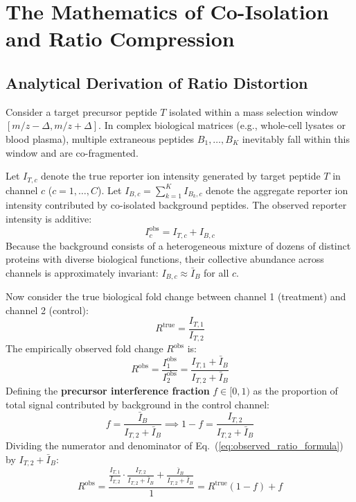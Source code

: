 \documentclass[11pt,oneside]{book}
\begin{document}
\section{The Mathematics of Co-Isolation and Ratio Compression}

\subsection{Analytical Derivation of Ratio Distortion}
Consider a target precursor peptide $T$ isolated within a mass selection window $[m/z - \Delta, m/z + \Delta]$. In complex biological matrices (e.g., whole-cell lysates or blood plasma), multiple extraneous peptides $B_1, \dots, B_K$ inevitably fall within this window and are co-fragmented.

Let $I_{T,c}$ denote the true reporter ion intensity generated by target peptide $T$ in channel $c$ ($c = 1, \dots, C$). Let $I_{B,c} = \sum_{k=1}^K I_{B_k,c}$ denote the aggregate reporter ion intensity contributed by co-isolated background peptides. The observed reporter intensity is additive:
\begin{equation}
I_c^{\text{obs}} = I_{T,c} + I_{B,c}
\label{eq:observed_intensity}
\end{equation}
Because the background consists of a heterogeneous mixture of dozens of distinct proteins with diverse biological functions, their collective abundance across channels is approximately invariant: $I_{B,c} \approx \bar{I}_B$ for all $c$.

Now consider the true biological fold change between channel 1 (treatment) and channel 2 (control):
\begin{equation}
R^{\text{true}} = \frac{I_{T,1}}{I_{T,2}}
\end{equation}
The empirically observed fold change $R^{\text{obs}}$ is:
\begin{equation}
R^{\text{obs}} = \frac{I_{1}^{\text{obs}}}{I_{2}^{\text{obs}}} = \frac{I_{T,1} + \bar{I}_B}{I_{T,2} + \bar{I}_B}
\label{eq:observed_ratio_formula}
\end{equation}
Defining the \textbf{precursor interference fraction} $f \in [0, 1)$ as the proportion of total signal contributed by background in the control channel:
\begin{equation}
f = \frac{\bar{I}_B}{I_{T,2} + \bar{I}_B} \implies 1 - f = \frac{I_{T,2}}{I_{T,2} + \bar{I}_B}
\label{eq:interference_fraction}
\end{equation}
Dividing the numerator and denominator of Eq.~(\ref{eq:observed_ratio_formula}) by $I_{T,2} + \bar{I}_B$:
\begin{equation}
R^{\text{obs}} = \frac{\frac{I_{T,1}}{I_{T,2}} \cdot \frac{I_{T,2}}{I_{T,2} + \bar{I}_B} + \frac{\bar{I}_B}{I_{T,2} + \bar{I}_B}}{1} = R^{\text{true}}(1 - f) + f
\label{eq:ratio_compression_linear}
\end{equation}
\end{document}
